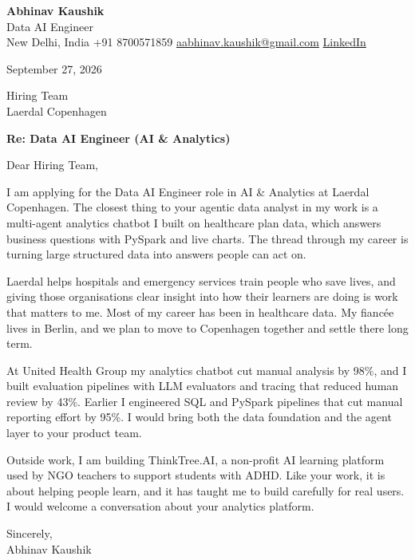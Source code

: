 \documentclass[11pt,a4paper]{article}
\begin{document}
{\Large\bfseries Abhinav Kaushik}\\
Data AI Engineer\\
New Delhi, India \textbar{} +91 8700571859 \textbar{} \href{mailto:aabhinav.kaushik@gmail.com}{aabhinav.kaushik@gmail.com} \textbar{} \href{https://www.linkedin.com/in/abhinav-kaushik10/}{LinkedIn}  

September 27, 2026

Hiring Team\\
Laerdal Copenhagen

\textbf{Re: Data AI Engineer (AI \& Analytics)}

Dear Hiring Team,

I am applying for the Data AI Engineer role in AI \& Analytics at Laerdal Copenhagen. The closest thing to your agentic data analyst in my work is a multi-agent analytics chatbot I built on healthcare plan data, which answers business questions with PySpark and live charts. The thread through my career is turning large structured data into answers people can act on.

Laerdal helps hospitals and emergency services train people who save lives, and giving those organisations clear insight into how their learners are doing is work that matters to me. Most of my career has been in healthcare data. My fiancée lives in Berlin, and we plan to move to Copenhagen together and settle there long term.

At United Health Group my analytics chatbot cut manual analysis by 98\%, and I built evaluation pipelines with LLM evaluators and tracing that reduced human review by 43\%. Earlier I engineered SQL and PySpark pipelines that cut manual reporting effort by 95\%. I would bring both the data foundation and the agent layer to your product team.

Outside work, I am building ThinkTree.AI, a non-profit AI learning platform used by NGO teachers to support students with ADHD. Like your work, it is about helping people learn, and it has taught me to build carefully for real users. I would welcome a conversation about your analytics platform.

Sincerely,\\[4pt]
Abhinav Kaushik
\end{document}
